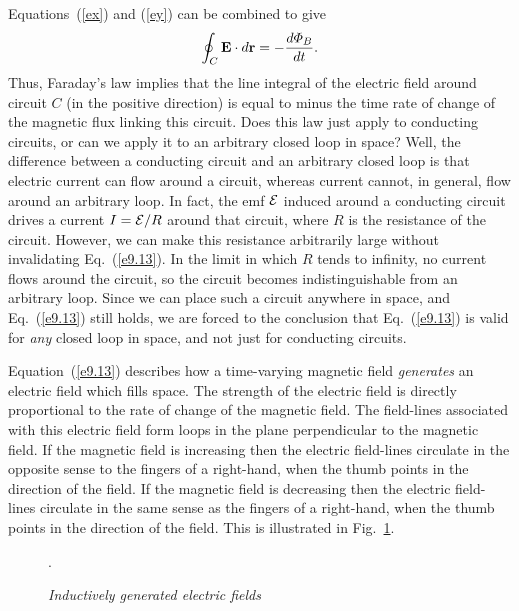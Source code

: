 Equations~(\ref{ex}) and (\ref{ey}) can be combined to give
\begin{equation}\label{e9.13}
 \oint_C {\bf E} \cdot d{\bf r}= -\frac{d{\mit\Phi}_B}{dt}.
\end{equation}
Thus, Faraday's law implies that the line integral of the electric field around circuit $C$
(in the positive direction) is equal to minus the time rate of change of the
magnetic flux linking this circuit. Does this law just apply to conducting
circuits, or can we apply it to an arbitrary closed loop in space? Well,
the difference between a conducting circuit and an arbitrary closed loop
is that electric current can flow around a circuit, whereas current
cannot, in general, flow around an arbitrary loop. In fact, the emf
${\cal E}$ induced around a conducting circuit drives a current $I={\cal E}/R$
around that circuit, where $R$ is the resistance of the circuit. However,
we can make this resistance arbitrarily large without invalidating Eq.~(\ref{e9.13}). 
In the limit in which $R$ tends to infinity, no current flows around the circuit,
so the circuit becomes indistinguishable from an arbitrary loop. Since we can place
such a circuit anywhere in space, and Eq.~(\ref{e9.13}) still holds, we are forced to the 
conclusion that Eq.~(\ref{e9.13}) is valid for {\em any} closed loop in space, and not just
for conducting circuits. 

Equation~(\ref{e9.13}) describes how a time-varying magnetic field {\em generates}\/
an electric field which fills space. The strength of the electric field is directly
proportional to the rate of change of the magnetic field. The 
field-lines associated with this electric
field  form loops in the plane perpendicular to the magnetic field. If the
magnetic field is increasing then the electric field-lines circulate in the
opposite sense to the fingers of a right-hand, when the thumb points 
in the direction of the field. If the
magnetic field is decreasing then the electric field-lines circulate in the
same sense as the fingers of a right-hand, when the thumb points 
in the direction of the field. This is illustrated in Fig.~\ref{f9.2}.

\begin{figure}
\epsfysize=3in
\centerline{}
\caption{\em Inductively generated electric fields}.\label{f9.2}
\end{figure}

